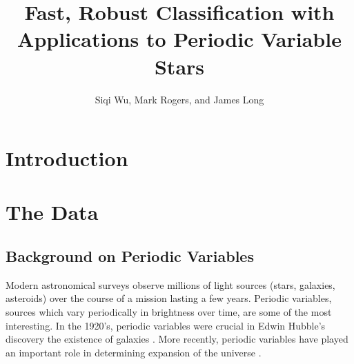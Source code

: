 \documentclass[10pt]{article}
\theoremstyle{definition}
\begin{document}
\title{Fast, Robust Classification with Applications to Periodic Variable Stars}
\author{Siqi Wu, Mark Rogers, and James Long}
\maketitle


\section{Introduction}

\section{The Data}
\subsection{Background on Periodic Variables}
Modern astronomical surveys observe millions of light sources (stars, galaxies, asteroids) over the course of a mission lasting a few years. Periodic variables, sources which vary periodically in brightness over time, are some of the most interesting. In the 1920's, periodic variables were crucial in Edwin Hubble's discovery the existence of galaxies \cite{berendzen1971hubble}. More recently, periodic variables have played an important role in determining expansion of the universe \cite{freedman2010hubble}.
\end{document}
